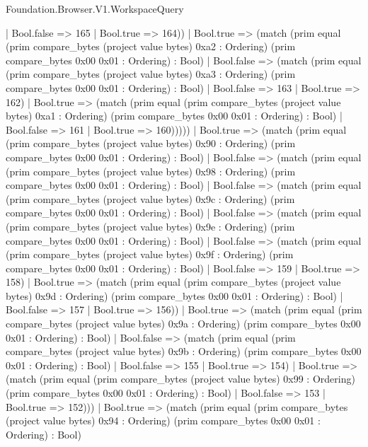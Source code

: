 \begin{lexlean}{Foundation.Browser.V1.WorkspaceQuery}
\begin{semanticmodule}
{                    | Bool.false => 165
                    | Bool.true => 164))
                | Bool.true => (match (prim equal (prim compare_bytes (project value bytes) 0xa2 : Ordering) (prim compare_bytes 0x00 0x01 : Ordering) : Bool)
                  | Bool.false => (match (prim equal (prim compare_bytes (project value bytes) 0xa3 : Ordering) (prim compare_bytes 0x00 0x01 : Ordering) : Bool)
                    | Bool.false => 163
                    | Bool.true => 162)
                  | Bool.true => (match (prim equal (prim compare_bytes (project value bytes) 0xa1 : Ordering) (prim compare_bytes 0x00 0x01 : Ordering) : Bool)
                    | Bool.false => 161
                    | Bool.true => 160)))))
          | Bool.true => (match (prim equal (prim compare_bytes (project value bytes) 0x90 : Ordering) (prim compare_bytes 0x00 0x01 : Ordering) : Bool)
            | Bool.false => (match (prim equal (prim compare_bytes (project value bytes) 0x98 : Ordering) (prim compare_bytes 0x00 0x01 : Ordering) : Bool)
              | Bool.false => (match (prim equal (prim compare_bytes (project value bytes) 0x9c : Ordering) (prim compare_bytes 0x00 0x01 : Ordering) : Bool)
                | Bool.false => (match (prim equal (prim compare_bytes (project value bytes) 0x9e : Ordering) (prim compare_bytes 0x00 0x01 : Ordering) : Bool)
                  | Bool.false => (match (prim equal (prim compare_bytes (project value bytes) 0x9f : Ordering) (prim compare_bytes 0x00 0x01 : Ordering) : Bool)
                    | Bool.false => 159
                    | Bool.true => 158)
                  | Bool.true => (match (prim equal (prim compare_bytes (project value bytes) 0x9d : Ordering) (prim compare_bytes 0x00 0x01 : Ordering) : Bool)
                    | Bool.false => 157
                    | Bool.true => 156))
                | Bool.true => (match (prim equal (prim compare_bytes (project value bytes) 0x9a : Ordering) (prim compare_bytes 0x00 0x01 : Ordering) : Bool)
                  | Bool.false => (match (prim equal (prim compare_bytes (project value bytes) 0x9b : Ordering) (prim compare_bytes 0x00 0x01 : Ordering) : Bool)
                    | Bool.false => 155
                    | Bool.true => 154)
                  | Bool.true => (match (prim equal (prim compare_bytes (project value bytes) 0x99 : Ordering) (prim compare_bytes 0x00 0x01 : Ordering) : Bool)
                    | Bool.false => 153
                    | Bool.true => 152)))
              | Bool.true => (match (prim equal (prim compare_bytes (project value bytes) 0x94 : Ordering) (prim compare_bytes 0x00 0x01 : Ordering) : Bool)
}
\end{semanticmodule}
\end{lexlean}
